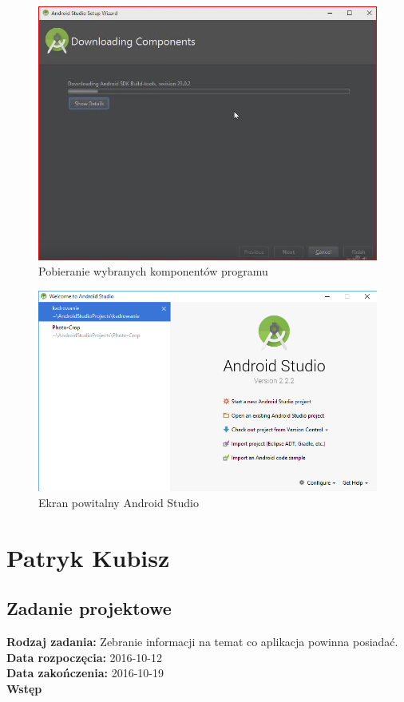 \begin{figure}[h!]
\centering
\includegraphics[width=0.5\linewidth]{fig/i5}
\caption{Pobieranie wybranych komponentów programu}
\label{fig:15}
\end{figure}

\begin{figure}[h!]
\centering
\includegraphics[width=0.7\linewidth]{fig/i6}
\caption{Ekran powitalny Android Studio}
\label{fig:16}
\end{figure}




\chapter {Patryk Kubisz}
\section{Zadanie projektowe}

\noindent\textbf{Rodzaj zadania:} Zebranie informacji na temat co aplikacja powinna posiadać.\\

\noindent\textbf{Data rozpoczęcia:} 2016-10-12\\

\noindent\textbf{Data zakończenia:} 2016-10-19\\

\noindent\textbf{Wstęp}\\

